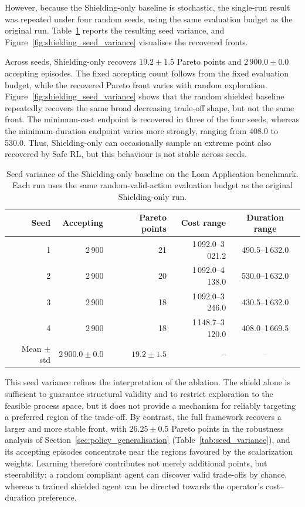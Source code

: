 However, because the Shielding-only baseline is stochastic, the
single-run result was repeated under four random seeds, using the same
evaluation budget as the original run. Table~\ref{tab:shielding_seed_variance}
reports the resulting seed variance, and Figure~\ref{fig:shielding_seed_variance} visualises the recovered fronts.

Across seeds, Shielding-only recovers $19.2 \pm 1.5$ Pareto points and
$2\,900.0 \pm 0.0$ accepting episodes. The fixed accepting count follows
from the fixed evaluation budget, while the recovered Pareto front
varies with random exploration. Figure~\ref{fig:shielding_seed_variance}
shows that the random shielded baseline repeatedly recovers the same
broad decreasing trade-off shape, but not the same front. The
minimum-cost endpoint is recovered in three of the four seeds, whereas
the minimum-duration endpoint varies more strongly, ranging from 408.0
to 530.0. Thus, Shielding-only can occasionally sample an extreme point
also recovered by Safe \ac{RL}, but this behaviour is not stable across
seeds.

\begin{table}[H]
\centering
\caption{Seed variance of the Shielding-only baseline on the Loan
Application benchmark. Each run uses the same random-valid-action
evaluation budget as the original Shielding-only run.}
\label{tab:shielding_seed_variance}
{\renewcommand{\arraystretch}{1.5}
\setlength{\tabcolsep}{6pt}
\begin{tabular}{rrrrc}
\toprule
\textbf{Seed} & \textbf{Accepting} & \textbf{Pareto points} &
\textbf{Cost range} & \textbf{Duration range} \\
\midrule
1 & 2\,900 & 21 & 1\,092.0--3\,021.2 & 490.5--1\,632.0 \\
2 & 2\,900 & 20 & 1\,092.0--4\,138.0 & 530.0--1\,632.0 \\
3 & 2\,900 & 18 & 1\,092.0--3\,246.0 & 430.5--1\,632.0 \\
4 & 2\,900 & 18 & 1\,148.7--3\,120.0 & 408.0--1\,669.5 \\
\midrule
Mean $\pm$ std & $2\,900.0 \pm 0.0$ & $19.2 \pm 1.5$ & -- & -- \\
\bottomrule
\end{tabular}}
\end{table}

This seed variance refines the interpretation of the ablation. The
shield alone is sufficient to guarantee structural validity and to
restrict exploration to the feasible process space, but it does not
provide a mechanism for reliably targeting a preferred region of the
trade-off. By contrast, the full framework recovers a larger and more
stable front, with $26.25 \pm 0.5$ Pareto points in the robustness analysis of Section~\ref{sec:policy_generalisation}
(Table~\ref{tab:seed_variance}), and its accepting episodes concentrate near the regions favoured by the scalarization weights. Learning therefore contributes
not merely additional points, but steerability: a random compliant agent
can discover valid trade-offs by chance, whereas a trained shielded
agent can be directed towards the operator's cost--duration preference.


